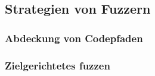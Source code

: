 

\subsection{Strategien von Fuzzern}\label{subsec:strategien-von-fuzzern}
\subsubsection{Abdeckung von Codepfaden}
\subsubsection{Zielgerichtetes fuzzen}